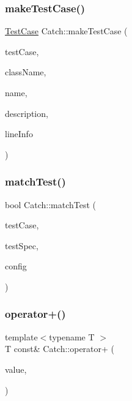 \subsubsection{\texorpdfstring{make\+Test\+Case()}{makeTestCase()}}
{\footnotesize\ttfamily \hyperlink{class_catch_1_1_test_case}{Test\+Case} Catch\+::make\+Test\+Case (\begin{DoxyParamCaption}\item[{\hyperlink{struct_catch_1_1_i_test_case}{I\+Test\+Case} $\ast$}]{test\+Case,  }\item[{\textbf{ std\+::string} const \&}]{class\+Name,  }\item[{\textbf{ std\+::string} const \&}]{name,  }\item[{\textbf{ std\+::string} const \&}]{description,  }\item[{\hyperlink{struct_catch_1_1_source_line_info}{Source\+Line\+Info} const \&}]{line\+Info }\end{DoxyParamCaption})}

\mbox{\label{namespace_catch_aadef80fbc6bc84589777a462770cef49}} 
\subsubsection{\texorpdfstring{match\+Test()}{matchTest()}}
{\footnotesize\ttfamily bool Catch\+::match\+Test (\begin{DoxyParamCaption}\item[{\hyperlink{class_catch_1_1_test_case}{Test\+Case} const \&}]{test\+Case,  }\item[{Test\+Spec const \&}]{test\+Spec,  }\item[{I\+Config const \&}]{config }\end{DoxyParamCaption})}

\mbox{\label{namespace_catch_a5e95b3c47a7618db3649dc39b0bb9004}} 
\subsubsection{\texorpdfstring{operator+()}{operator+()}}
{\footnotesize\ttfamily template$<$typename T $>$ \\
T const\& Catch\+::operator+ (\begin{DoxyParamCaption}\item[{T const \&}]{value,  }\item[{\hyperlink{struct_catch_1_1_stream_end_stop}{Stream\+End\+Stop}}]{ }\end{DoxyParamCaption})}

